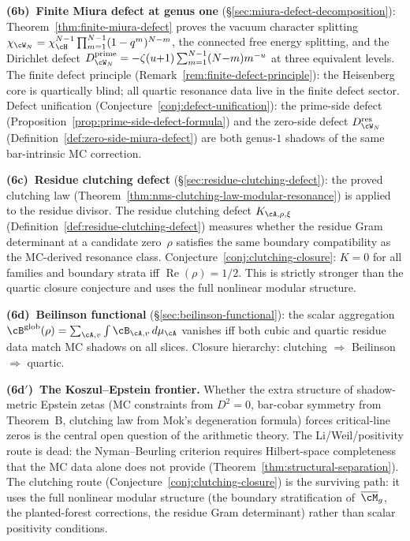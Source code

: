 \smallskip\noindent
\textbf{(6b)~Finite Miura defect at genus one}
(\S\ref{sec:miura-defect-decomposition}):
Theorem~\ref{thm:finite-miura-defect} proves the vacuum
character splitting $\chi_{\cW_N} = \chi_\cH^{N-1}
\prod_{m=1}^{N-1}(1-q^m)^{N-m}$, the connected free energy
splitting, and the Dirichlet defect
$D_{\cW_N}^{\mathrm{prime}} = -\zeta(u{+}1)\sum_{m=1}^{N-1}(N{-}m)m^{-u}$
at three equivalent levels. The finite defect principle
(Remark~\ref{rem:finite-defect-principle}):
the Heisenberg core is quartically blind; all quartic
resonance data live in the finite defect sector.
Defect unification (Conjecture~\ref{conj:defect-unification}):
the prime-side defect
(Proposition~\ref{prop:prime-side-defect-formula})
and the zero-side defect
$D_{\cW_N}^{\mathrm{res}}$
(Definition~\ref{def:zero-side-miura-defect})
are both genus-$1$ shadows of the same bar-intrinsic MC correction.

\smallskip\noindent
\textbf{(6c)~Residue clutching defect}
(\S\ref{sec:residue-clutching-defect}):
the proved clutching law
(Theorem~\ref{thm:nms-clutching-law-modular-resonance})
is applied to the residue divisor.
The residue clutching defect $K_{\cA,\rho,\xi}$
(Definition~\ref{def:residue-clutching-defect})
measures whether the residue Gram determinant at a
candidate zero~$\rho$ satisfies the same boundary
compatibility as the MC-derived resonance class.
Conjecture~\ref{conj:clutching-closure}: $K = 0$ for all
families and boundary strata iff $\operatorname{Re}(\rho) = 1/2$.
This is strictly stronger than the quartic closure conjecture
and uses the full nonlinear modular structure.

\smallskip\noindent
\textbf{(6d)~Beilinson functional}
(\S\ref{sec:beilinson-functional}):
the scalar aggregation
$\cB^{\mathrm{glob}}(\rho) = \sum_{\cA,v}\int
\cB_{\cA,v}\,d\mu_\cA$ vanishes iff both cubic and quartic
residue data match MC shadows on all slices.
Closure hierarchy: clutching $\Rightarrow$ Beilinson
$\Rightarrow$ quartic.

\smallskip\noindent
\textbf{(6d$'$)~The Koszul--Epstein frontier.}
Whether the extra structure of shadow-metric Epstein zetas
(MC constraints from $D^2 = 0$, bar-cobar symmetry from
Theorem~B, clutching law from Mok's degeneration formula)
forces critical-line zeros is the central open question of
the arithmetic theory.
The Li/Weil/positivity route is dead: the Nyman--Beurling
criterion requires Hilbert-space completeness that the
MC data alone does not provide
(Theorem~\ref{thm:structural-separation}).
The clutching route
(Conjecture~\ref{conj:clutching-closure}) is the surviving
path: it uses the full nonlinear modular structure
(the boundary stratification of~$\overline{\cM}_g$,
the planted-forest corrections, the residue Gram
determinant) rather than scalar positivity conditions.

